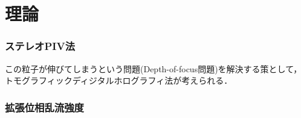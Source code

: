 \section{理論}
\subsubsection{ステレオPIV法}
この粒子が伸びてしまうという問題(Depth-of-focus問題)を解決する策として，トモグラフィックディジタルホログラフィ法が考えられる．

\subsubsection{拡張位相乱流強度}


